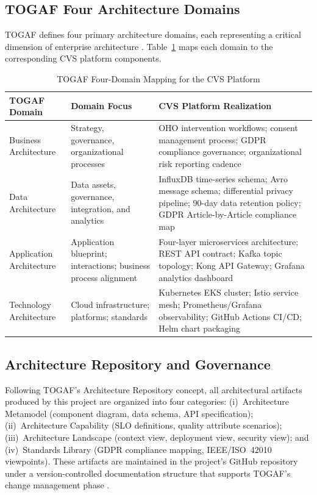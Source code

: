 \documentclass[conference]{IEEEtran}
\begin{document}
\subsection{TOGAF Four Architecture Domains}

TOGAF defines four primary architecture domains, each representing a critical dimension
of enterprise architecture \cite{b26}. Table~\ref{tab:togafdomains} maps each domain
to the corresponding CVS platform components.

\begin{table}[H]
  \centering
  \caption{TOGAF Four-Domain Mapping for the CVS Platform}
  \label{tab:togafdomains}
  \begin{tabularx}{\textwidth}{p{3.5cm} p{5cm} X}
    \toprule
    \textbf{TOGAF Domain} & \textbf{Domain Focus} & \textbf{CVS Platform Realization} \\
    \midrule
    Business Architecture & Strategy, governance, organizational processes &
      OHO intervention workflows; consent management process; GDPR compliance
      governance; organizational risk reporting cadence \\
    \addlinespace
    Data Architecture & Data assets, governance, integration, and analytics &
      InfluxDB time-series schema; Avro message schema; differential privacy
      pipeline; 90-day data retention policy; GDPR Article-by-Article compliance map \\
    \addlinespace
    Application Architecture & Application blueprint; interactions; business
    process alignment &
      Four-layer microservices architecture; REST API contract; Kafka topic
      topology; Kong API Gateway; Grafana analytics dashboard \\
    \addlinespace
    Technology Architecture & Cloud infrastructure; platforms; standards &
      Kubernetes EKS cluster; Istio service mesh; Prometheus/Grafana observability;
      GitHub Actions CI/CD; Helm chart packaging \\
    \bottomrule
  \end{tabularx}
\end{table}

\subsection{Architecture Repository and Governance}

Following TOGAF's Architecture Repository concept, all architectural artifacts produced
by this project are organized into four categories: (i)~Architecture Metamodel
(component diagram, data schema, API specification); (ii)~Architecture Capability
(SLO definitions, quality attribute scenarios); (iii)~Architecture Landscape
(context view, deployment view, security view); and (iv)~Standards Library (GDPR
compliance mapping, IEEE/ISO~42010 viewpoints). These artifacts are maintained in the
project's GitHub repository under a version-controlled documentation structure that
supports TOGAF's change management phase \cite{b27}.
\end{document}
